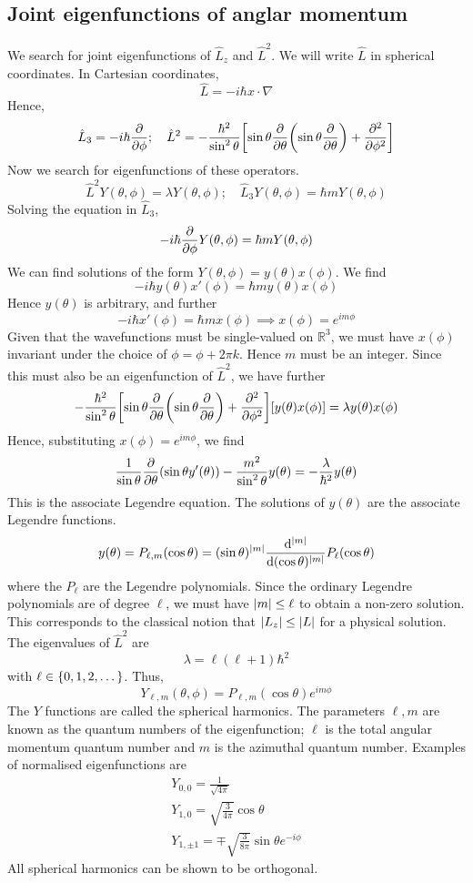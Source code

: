 \subsection{Joint eigenfunctions of anglar momentum}
We search for joint eigenfunctions of \( \hat L_z \) and \( \hat L^2 \).
We will write \( \hat L \) in spherical coordinates.
In Cartesian coordinates,
\[
	\hat L = -i \hbar x \cdot \nabla
\]
Hence,
\[
	\hat L_3 = -i \hbar \pdv{\phi};\quad \hat L^2 = -\frac{\hbar^2}{\sin^2 \theta} \qty[\sin \theta \pdv{\theta} \qty(\sin \theta \pdv{\theta}) + \pdv[2]{\phi} ]
\]
Now we search for eigenfunctions of these operators.
\[
	\hat L^2 Y(\theta, \phi) = \lambda Y(\theta, \phi);\quad \hat L_3 Y(\theta, \phi) = \hbar m Y(\theta, \phi)
\]
Solving the equation in \( \hat L_3 \),
\[
	-i\hbar \pdv{\phi} Y(\theta, \phi) = \hbar m Y(\theta, \phi)
\]
We can find solutions of the form \( Y(\theta, \phi) = y(\theta)x(\phi) \).
We find
\[
	-i\hbar y(\theta) x'(\phi) = \hbar m y(\theta) x(\phi)
\]
Hence \( y(\theta) \) is arbitrary, and further
\[
	-i\hbar x'(\phi) = \hbar m x(\phi) \implies x(\phi) = e^{i m \phi}
\]
Given that the wavefunctions must be single-valued on \( \mathbb R^3 \), we must have \( x(\phi) \) invariant under the choice of \( \phi = \phi + 2\pi k \).
Hence \( m \) must be an integer.
Since this must also be an eigenfunction of \( \hat L^2 \), we have further
\[
	-\frac{\hbar^2}{\sin^2 \theta} \qty[\sin \theta \pdv{\theta} \qty(\sin \theta \pdv{\theta}) + \pdv[2]{\phi} ] [y(\theta) x(\phi)] = \lambda y(\theta) x(\phi)
\]
Hence, substituting \( x(\phi) = e^{i m \phi} \), we find
\[
	\frac{1}{\sin \theta} \pdv{\theta} \qty(\sin \theta y'(\theta)) - \frac{m^2}{\sin^2 \theta} y(\theta) = - \frac{\lambda}{\hbar^2} y(\theta)
\]
This is the associate Legendre equation.
The solutions of \( y(\theta) \) are the associate Legendre functions.
\[
	y(\theta) = P_{\ell,m}(\cos \theta) = (\sin \theta)^{\abs{m}} \dv[\abs{m}]{(\cos \theta)}  P_\ell(\cos \theta)
\]
where the \( P_\ell \) are the Legendre polynomials.
Since the ordinary Legendre polynomials are of degree \( \ell \), we must have \( \abs{m} \leq \ell \) to obtain a non-zero solution.
This corresponds to the classical notion that \( \abs{L_z} \leq \abs{L} \) for a physical solution.
The eigenvalues of \( \hat L^2 \) are
\[
	\lambda = \ell(\ell+1) \hbar^2
\]
with \( \ell \in \qty{0, 1, 2, \dots} \).
Thus,
\[
	Y_{\ell, m}(\theta, \phi) = P_{\ell,m}(\cos\theta) e^{im\phi}
\]
The \( Y \) functions are called the spherical harmonics.
The parameters \( \ell, m \) are known as the quantum numbers of the eigenfunction; \( \ell \) is the total angular momentum quantum number and \( m \) is the azimuthal quantum number.
Examples of normalised eigenfunctions are
\begin{align*}
	Y_{0,0} = \frac{1}{\sqrt{4 \pi}}             \\
	Y_{1,0} = \sqrt{\frac{3}{4 \pi}} \cos \theta \\
	Y_{1,\pm 1} = \mp \sqrt{\frac{3}{8 \pi}} \sin \theta e^{-i \phi}
\end{align*}
All spherical harmonics can be shown to be orthogonal.
